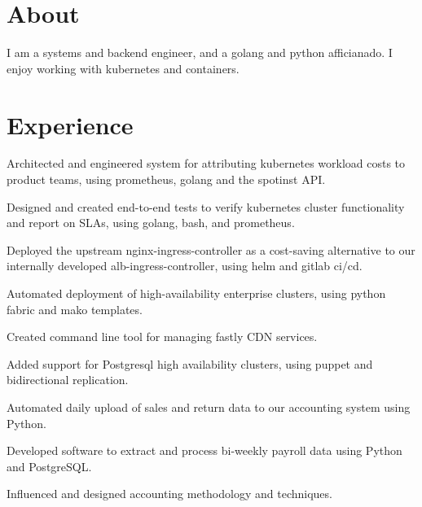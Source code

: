 \documentclass[]{deemweaver}
\begin{document}
\begin{minipage}[t]{0.66\textwidth}

\section{About}
I am a systems and backend engineer, and a golang and python afficianado. I enjoy working with kubernetes and containers.

\section{Experience}
\begin{tightemize}
\vspace{\topsep} %
\item Architected and engineered system for attributing kubernetes workload costs to product teams, using prometheus, golang and the spotinst API.
\item Designed and created end-to-end tests to verify kubernetes cluster functionality and report on SLAs, using golang, bash, and prometheus.
\item Deployed the upstream nginx-ingress-controller as a cost-saving alternative to our internally developed alb-ingress-controller, using helm and gitlab ci/cd.
\end{tightemize}
\sectionsep


\begin{tightemize}
\vspace{\topsep} %
\item Automated deployment of high-availability enterprise clusters, using python fabric and mako templates.
\item Created command line tool for managing fastly CDN services.
\item Added support for Postgresql high availability clusters, using puppet and bidirectional replication.
\end{tightemize}
\sectionsep


\begin{tightemize}
\vspace{\topsep} %
\item Automated daily upload of sales and return data to our accounting system using Python.
\item Developed software to extract and process bi-weekly payroll data using Python and PostgreSQL.
\item Influenced and designed accounting methodology and techniques.
\end{tightemize}
\sectionsep


\end{minipage}
\end{document}
